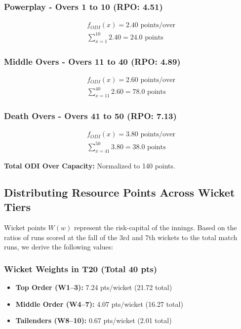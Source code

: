 \documentclass[12pt, letterpaper, fleqn]{article}
\begin{document}
\subsubsection{Powerplay - Overs 1 to 10 (RPO: 4.51)}
\begin{align*}
& f_{ODI}(x) = 2.40 \text{ points/over} \\
& \sum_{x=1}^{10} 2.40 = 24.0 \text{ points}
\end{align*}

\subsubsection{Middle Overs - Overs 11 to 40 (RPO: 4.89)}
\begin{align*}
& f_{ODI}(x) = 2.60 \text{ points/over} \\
& \sum_{x=11}^{40} 2.60 = 78.0 \text{ points}
\end{align*}

\subsubsection{Death Overs - Overs 41 to 50 (RPO: 7.13)}
\begin{align*}
& f_{ODI}(x) = 3.80 \text{ points/over} \\
& \sum_{x=41}^{50} 3.80 = 38.0 \text{ points}
\end{align*}

\vspace{1em}
\noindent \textbf{Total ODI Over Capacity:} Normalized to 140 points.

\subsection{Distributing Resource Points Across Wicket Tiers}

\indent Wicket points $W(w)$ represent the risk-capital of the innings. Based on the ratios of runs scored at the fall of the 3rd and 7th wickets to the total match runs, we derive the following values:

\subsubsection{Wicket Weights in T20 (Total 40 pts)}
\begin{itemize}
    \item \textbf{Top Order (W1--3):} 7.24 pts/wicket (21.72 total)
    \item \textbf{Middle Order (W4--7):} 4.07 pts/wicket (16.27 total)
    \item \textbf{Tailenders (W8--10):} 0.67 pts/wicket (2.01 total)
\end{itemize}
\end{document}
